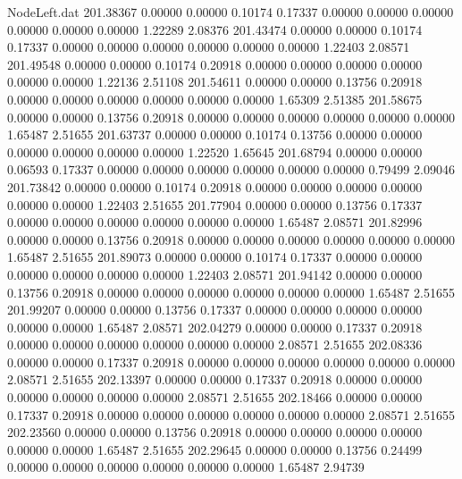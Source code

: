 \begin{filecontents}{NodeLeft.dat}
 201.38367    0.00000    0.00000     0.10174    0.17337    0.00000    0.00000    0.00000    0.00000    0.00000    0.00000    1.22289    2.08376
 201.43474    0.00000    0.00000     0.10174    0.17337    0.00000    0.00000    0.00000    0.00000    0.00000    0.00000    1.22403    2.08571
 201.49548    0.00000    0.00000     0.10174    0.20918    0.00000    0.00000    0.00000    0.00000    0.00000    0.00000    1.22136    2.51108
 201.54611    0.00000    0.00000     0.13756    0.20918    0.00000    0.00000    0.00000    0.00000    0.00000    0.00000    1.65309    2.51385
 201.58675    0.00000    0.00000     0.13756    0.20918    0.00000    0.00000    0.00000    0.00000    0.00000    0.00000    1.65487    2.51655
 201.63737    0.00000    0.00000     0.10174    0.13756    0.00000    0.00000    0.00000    0.00000    0.00000    0.00000    1.22520    1.65645
 201.68794    0.00000    0.00000     0.06593    0.17337    0.00000    0.00000    0.00000    0.00000    0.00000    0.00000    0.79499    2.09046
 201.73842    0.00000    0.00000     0.10174    0.20918    0.00000    0.00000    0.00000    0.00000    0.00000    0.00000    1.22403    2.51655
 201.77904    0.00000    0.00000     0.13756    0.17337    0.00000    0.00000    0.00000    0.00000    0.00000    0.00000    1.65487    2.08571
 201.82996    0.00000    0.00000     0.13756    0.20918    0.00000    0.00000    0.00000    0.00000    0.00000    0.00000    1.65487    2.51655
 201.89073    0.00000    0.00000     0.10174    0.17337    0.00000    0.00000    0.00000    0.00000    0.00000    0.00000    1.22403    2.08571
 201.94142    0.00000    0.00000     0.13756    0.20918    0.00000    0.00000    0.00000    0.00000    0.00000    0.00000    1.65487    2.51655
 201.99207    0.00000    0.00000     0.13756    0.17337    0.00000    0.00000    0.00000    0.00000    0.00000    0.00000    1.65487    2.08571
 202.04279    0.00000    0.00000     0.17337    0.20918    0.00000    0.00000    0.00000    0.00000    0.00000    0.00000    2.08571    2.51655
 202.08336    0.00000    0.00000     0.17337    0.20918    0.00000    0.00000    0.00000    0.00000    0.00000    0.00000    2.08571    2.51655
 202.13397    0.00000    0.00000     0.17337    0.20918    0.00000    0.00000    0.00000    0.00000    0.00000    0.00000    2.08571    2.51655
 202.18466    0.00000    0.00000     0.17337    0.20918    0.00000    0.00000    0.00000    0.00000    0.00000    0.00000    2.08571    2.51655
 202.23560    0.00000    0.00000     0.13756    0.20918    0.00000    0.00000    0.00000    0.00000    0.00000    0.00000    1.65487    2.51655
 202.29645    0.00000    0.00000     0.13756    0.24499    0.00000    0.00000    0.00000    0.00000    0.00000    0.00000    1.65487    2.94739

\end{filecontents}
